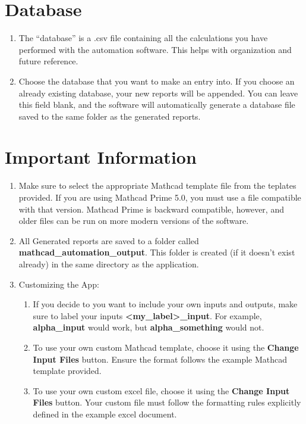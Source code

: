 \documentclass[11pt]{article}
\begin{document}
\section{Database}
\label{sec:orgf737122}
\begin{enumerate}
\item The ``database'' is a .csv file containing all the calculations you have performed with the automation software. This helps with organization and future reference.
\item Choose the database that you want to make an entry into. If you choose an already existing database, your new reports will be appended. You can leave this field blank, and the software will automatically generate a database file saved to the same folder as the generated reports.
\end{enumerate}
\section{Important Information}
\label{sec:orga94bab5}
\begin{enumerate}
\item Make sure to select the appropriate Mathcad template file from the teplates provided. If you are using Mathcad Prime 5.0, you must use a file compatible with that version. Mathcad Prime is backward compatible, however, and older files can be run on more modern versions of the software.
\item All Generated reports are saved to a folder called \textbf{mathcad\_automation\_output}. This folder is created (if it doesn't exist already) in the same directory as the application.
\item Customizing the App:
\begin{enumerate}
\item If you decide to you want to include your own inputs and outputs, make sure to label your inputs \textbf{<my\_label>\_input}. For example, \textbf{alpha\_input} would work, but \textbf{alpha\_something} would not.
\item To use your own custom Mathcad template, choose it using the \textbf{Change Input Files} button. Ensure the format follows the example Mathcad template provided.
\item To use your own custom excel file, choose it using the \textbf{Change Input Files} button. Your custom file must follow the formatting rules explicitly defined in the example excel document.
\end{enumerate}
\end{enumerate}
\end{document}
